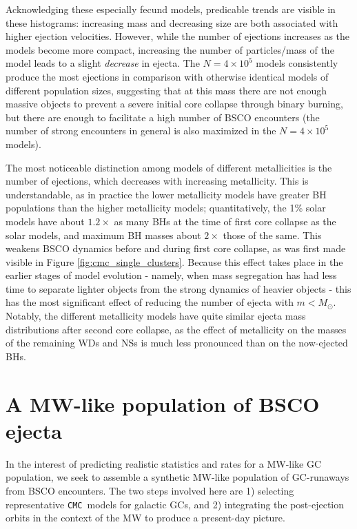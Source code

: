 \documentclass[twocolumn]{aastex631}
\newcommand{\CMC}{\texttt{CMC}}
\begin{document}
Acknowledging these especially fecund models, predicable trends are visible in these histograms: increasing mass and decreasing size are both associated with higher ejection velocities.
However, while the number of ejections increases as the models become more compact, increasing the number of particles/mass of the model leads to a slight \textit{decrease} in ejecta.
The $N = 4 \times 10^5$ models consistently produce the most ejections in comparison with otherwise identical models of different population sizes, suggesting that at this mass there are not enough massive objects to prevent a severe initial core collapse through binary burning, but there are enough to facilitate a high number of BSCO encounters (the number of strong encounters in general is also maximized in the $N = 4 \times 10^5$ models).

The most noticeable distinction among models of different metallicities is the number of ejections, which decreases with increasing metallicity.
This is understandable, as in practice the lower metallicity models have greater BH populations than the higher metallicity models; quantitatively, the 1\% solar models have about $1.2 \times$ as many BHs at the time of first core collapse as the solar models, and maximum BH masses about $2 \times$ those of the same.
This weakens BSCO dynamics before and during first core collapse, as was first made visible in Figure \ref{fig:cmc_single_clusters}.
Because this effect takes place in the earlier stages of model evolution - namely, when mass segregation has had less time to separate lighter objects from the strong dynamics of heavier objects - this has the most significant effect of reducing the number of ejecta with $m < M_\odot$.
Notably, the different metallicity models have quite similar ejecta mass distributions after second core collapse, as the effect of metallicity on the masses of the remaining WDs and NSs is much less pronounced than on the now-ejected BHs.

\section{A MW-like population of BSCO ejecta} \label{sec:est_MW-like}

In the interest of predicting realistic statistics and rates for a MW-like GC population, we seek to assemble a synthetic MW-like population of GC-runaways from BSCO encounters.
The two steps involved here are 1) selecting representative \CMC\ models for galactic GCs, and 2) integrating the post-ejection orbits in the context of the MW to produce a present-day picture.
\end{document}
